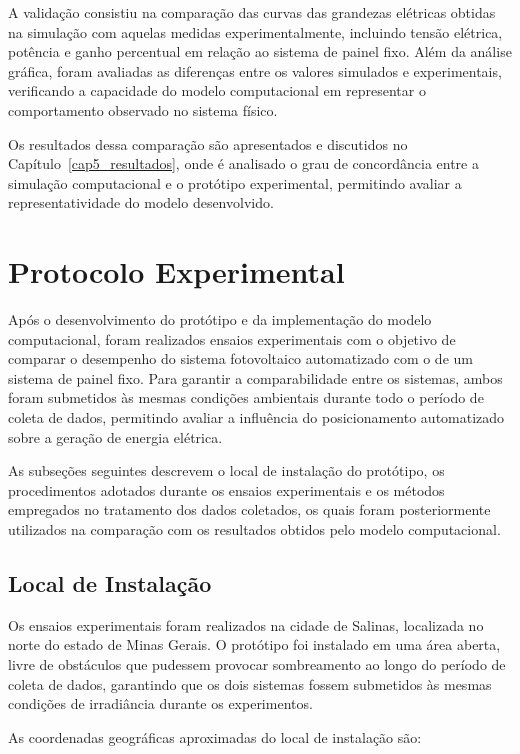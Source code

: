 A validação consistiu na comparação das curvas das grandezas elétricas obtidas na simulação com aquelas medidas experimentalmente, incluindo tensão elétrica, potência e ganho percentual em relação ao sistema de painel fixo. Além da análise gráfica, foram avaliadas as diferenças entre os valores simulados e experimentais, verificando a capacidade do modelo computacional em representar o comportamento observado no sistema físico.

Os resultados dessa comparação são apresentados e discutidos no Capítulo~\ref{cap5_resultados}, onde é analisado o grau de concordância entre a simulação computacional e o protótipo experimental, permitindo avaliar a representatividade do modelo desenvolvido.

\section{Protocolo Experimental}

Após o desenvolvimento do protótipo e da implementação do modelo computacional, foram realizados ensaios experimentais com o objetivo de comparar o desempenho do sistema fotovoltaico automatizado com o de um sistema de painel fixo. Para garantir a comparabilidade entre os sistemas, ambos foram submetidos às mesmas condições ambientais durante todo o período de coleta de dados, permitindo avaliar a influência do posicionamento automatizado sobre a geração de energia elétrica.

As subseções seguintes descrevem o local de instalação do protótipo, os procedimentos adotados durante os ensaios experimentais e os métodos empregados no tratamento dos dados coletados, os quais foram posteriormente utilizados na comparação com os resultados obtidos pelo modelo computacional.


\subsection{Local de Instalação}

Os ensaios experimentais foram realizados na cidade de Salinas, localizada no norte do estado de Minas Gerais. O protótipo foi instalado em uma área aberta, livre de obstáculos que pudessem provocar sombreamento ao longo do período de coleta de dados, garantindo que os dois sistemas fossem submetidos às mesmas condições de irradiância durante os experimentos.

As coordenadas geográficas aproximadas do local de instalação são:

